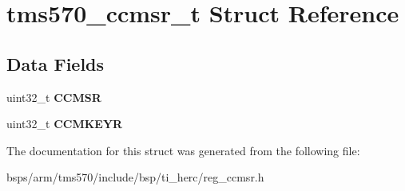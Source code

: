 \hypertarget{structtms570__ccmsr__t}{}\section{tms570\+\_\+ccmsr\+\_\+t Struct Reference}
\label{structtms570__ccmsr__t}
\subsection*{Data Fields}
\begin{DoxyCompactItemize}
\item 
\mbox{\label{structtms570__ccmsr__t_a1fc9b2117e932fcfefa61983439f45eb}} 
uint32\+\_\+t {\bfseries C\+C\+M\+SR}
\item 
\mbox{\label{structtms570__ccmsr__t_a184b195112938049127d0bf6f6fc1049}} 
uint32\+\_\+t {\bfseries C\+C\+M\+K\+E\+YR}
\end{DoxyCompactItemize}


The documentation for this struct was generated from the following file\+:\begin{DoxyCompactItemize}
\item 
bsps/arm/tms570/include/bsp/ti\+\_\+herc/reg\+\_\+ccmsr.\+h\end{DoxyCompactItemize}
